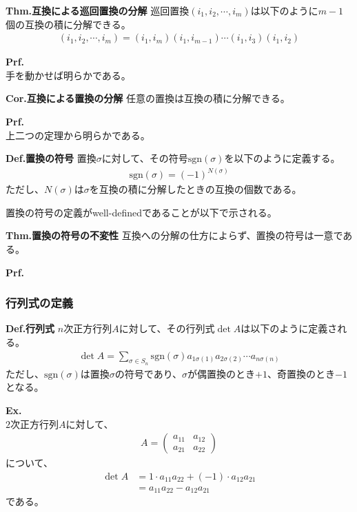 \documentclass[a4paper,11pt]{jsarticle}
\numberwithin{equation}{section}
\begin{document}
\begin{itembox}[l]{\textbf{Thm.互換による巡回置換の分解}}
  巡回置換$(i_1,i_2,\cdots,i_m)$は以下のように$m-1$個の互換の積に分解できる。
  \begin{align}
    (i_1,i_2,\cdots,i_m) = (i_1,i_m)(i_1,i_{m-1})\cdots(i_1,i_3)(i_1,i_2)
  \end{align}
\end{itembox}
\textbf{Prf.}\\
手を動かせば明らかである。\hfill\qedsymbol\\

\begin{itembox}[l]{\textbf{Cor.互換による置換の分解}}
  任意の置換は互換の積に分解できる。
\end{itembox}
\textbf{Prf.}\\
上二つの定理から明らかである。\hfill\qedsymbol\\

\begin{itembox}[l]{\textbf{Def.置換の符号}}
  置換$\sigma$に対して、その符号$\text{sgn}(\sigma)$を以下のように定義する。
  \begin{align}
    \text{sgn}(\sigma) = (-1)^{N(\sigma)}
  \end{align}
  ただし、$N(\sigma)$は$\sigma$を互換の積に分解したときの互換の個数である。
\end{itembox}

置換の符号の定義がwell-definedであることが以下で示される。\\
\begin{itembox}[l]{\textbf{Thm.置換の符号の不変性}}
  互換への分解の仕方によらず、置換の符号は一意である。
\end{itembox}
\textbf{Prf.}\\


\subsubsection{行列式の定義}
\begin{itembox}[l]{\textbf{Def.行列式}}
  $n$次正方行列$A$に対して、その行列式$\det A$は以下のように定義される。
  \begin{align}
    \det A = \sum_{\sigma \in S_n} \text{sgn}(\sigma) a_{1\sigma(1)}a_{2\sigma(2)}\cdots a_{n\sigma(n)}
  \end{align}
  ただし、$\text{sgn}(\sigma)$は置換$\sigma$の符号であり、$\sigma$が偶置換のとき$+1$、奇置換のとき$-1$となる。
\end{itembox}
\textbf{Ex.}\\
$2$次正方行列$A$に対して、
\begin{align}
  A = \begin{pmatrix}
    a_{11} & a_{12}\\
    a_{21} & a_{22}
  \end{pmatrix}
\end{align}
について、
\begin{align}
  \det A &= 1 \cdot a_{11}a_{22} + (-1) \cdot a_{12}a_{21}\\
  &= a_{11}a_{22} - a_{12}a_{21}
\end{align}
である。\\
\end{document}

